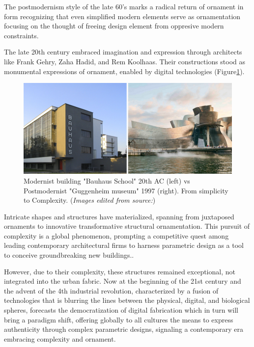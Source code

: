 
The postmodernism style of the late 60's marks a radical return of ornament in form recognizing that even simplified modern elements serve as ornamentation focusing on the thought of freeing design element from oppresive modern constraints.



The late 20th century embraced imagination and expression through architects like Frank Gehry, Zaha Hadid, and Rem Koolhaas.
Their constructions stood as monumental expressions of ornament, enabled by digital technologies (Figure\ref{fig:Modernismvspostmodernism}).

     \begin{figure}[htb]
          \centering
          \includegraphics[width= \linewidth]{Images/modernism vs postmodernism}
          \caption{Modernist building "Bauhaus School" 20th AC (left) vs Postmodernist "Guggenheim museum" 1997 (right). From simplicity to Complexity. (\textit{Images edited from source:\cite{Arora2023}})}
          \label{fig:Modernismvspostmodernism}
        \end{figure}

Intricate shapes and structures have materialized, spanning from juxtaposed ornaments to innovative transformative structural ornamentation.
This pursuit of complexity is a global phenomenon, prompting a competitive quest among leading contemporary architectural firms to harness parametric design as a tool to conceive groundbreaking new buildings.\cite{Burlando2019}.

However, due to their complexity, these structures remained exceptional, not integrated into the urban fabric.
Now at the beginning of the 21st century and the advent of the 4th industrial revolution, characterized by a fusion of technologies that is blurring the lines between the physical, digital, and biological spheres\cite{Schwab2016}, forecasts the democratization of digital fabrication which in turn will bring a paradigm shift, offering globally to all cultures the means to express authenticity through complex parametric designs, signaling a contemporary era embracing complexity and ornament.

